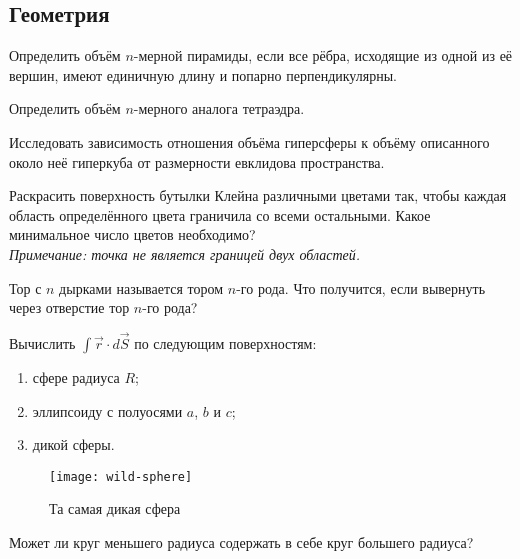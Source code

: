    \subsection{Геометрия}
    \begin{problem}
        Определить объём \(n\)-мерной пирамиды, если все рёбра, исходящие из
        одной из её вершин, имеют единичную длину и попарно перпендикулярны.
    \end{problem}
    \begin{problem}
        Определить объём \(n\)-мерного аналога тетраэдра.
    \end{problem}
    \begin{problem}
        Исследовать зависимость отношения объёма гиперсферы к объёму описанного
        около неё гиперкуба от размерности евклидова пространства.
    \end{problem}
    \begin{problem}
        Раскрасить поверхность бутылки Клейна различными цветами так, чтобы
        каждая область определённого цвета граничила со всеми остальными.
        Какое минимальное число цветов необходимо?\\
        \textit{Примечание: точка не является границей двух областей.}
    \end{problem}
    \begin{problem}
        Тор с \(n\) дырками называется тором \(n\)-го рода. Что получится, если
        вывернуть через отверстие тор \(n\)-го рода?
    \end{problem}
    \begin{problem}
        Вычислить \( \int \vec{r} \cdot d\vec{S} \) по следующим
        поверхностям:
        \begin{enumerate}
            \item сфере радиуса \( R \);
            \item эллипсоиду с полуосями \( a \), \( b \) и \( c \);
            \item дикой сферы.
        \end{enumerate}
        \begin{figure}[h]
            \centering
            \texttt{[image: wild-sphere]}
            \caption{Та самая дикая сфера}
            \label{fig:wild-sphere}
        \end{figure}
    \end{problem}
    \begin{problem}
        Может ли круг меньшего радиуса содержать в себе круг большего радиуса?
    \end{problem}
